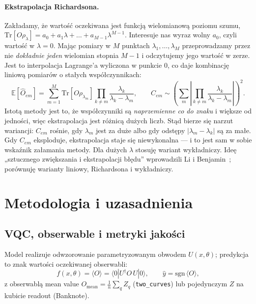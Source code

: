 \documentclass[11pt,a4paper]{article}
\begin{document}
\paragraph{Ekstrapolacja Richardsona.} Zakładamy, że wartość oczekiwana jest funkcją
wielomianową poziomu szumu, $\mathrm{Tr}[O\rho_\lambda] = a_0 + a_1\lambda + \dots +
a_{M-1}\lambda^{M-1}$. Interesuje nas wyraz wolny $a_0$, czyli wartość w $\lambda = 0$. Mając
pomiary w $M$ punktach $\lambda_1,\dots,\lambda_M$ przeprowadzamy przez nie \emph{dokładnie
jeden} wielomian stopnia $M-1$ i odczytujemy jego wartość w zerze. Jest to interpolacja
Lagrange'a wyliczona w punkcie $0$, co daje kombinację liniową pomiarów o stałych
współczynnikach:
\begin{equation}
\mathbb{E}[\hat{O}_{em}] = \sum_{m=1}^{M} \mathrm{Tr}[O\rho_{\lambda_m}]
\prod_{k\neq m}\frac{\lambda_k}{\lambda_k-\lambda_m},
\qquad
C_{em} \sim \left(\sum_m \left|\prod_{k\neq m}\frac{\lambda_k}{\lambda_k-\lambda_m}\right|\right)^{2}.
\end{equation}
Istotą metody jest to, że współczynniki są \emph{naprzemienne co do znaku} i większe od
jedności, więc ekstrapolacja jest różnicą dużych liczb. Stąd bierze się narzut wariancji:
$C_{em}$ rośnie, gdy $\lambda_m$ jest za duże albo gdy odstępy $|\lambda_m-\lambda_k|$ są za
małe. Gdy $C_{em}$ eksploduje, ekstrapolacja staje się niewykonalna --- i to jest sam w sobie
wskaźnik załamania metody. Dla dużych $\lambda$ stosuję wariant wykładniczy. Ideę
„sztucznego zwiększania i ekstrapolacji błędu” wprowadzili Li i Benjamin~\cite{li2017};
porównuję warianty liniowy, Richardsona i wykładniczy.

\section{Metodologia i uzasadnienia}

\subsection{VQC, obserwable i metryki jakości}

Model realizuje odwzorowanie parametryzowanym obwodem $U(x,\theta)$; predykcja to znak
wartości oczekiwanej obserwabli:
\begin{equation}
f(x,\theta) = \langle O\rangle = \langle 0|U^{\dagger} O\, U|0\rangle,
\qquad \hat{y} = \mathrm{sgn}\,\langle O\rangle,
\end{equation}
z obserwablą mean value $O_{\text{mean}} = \frac{1}{n}\sum_q Z_q$ (\texttt{two\_curves}) lub
pojedynczym $Z$ na kubicie readout (Banknote).
\end{document}
